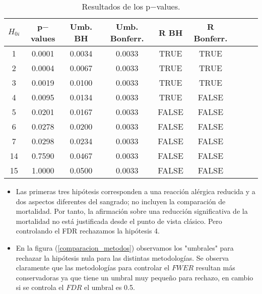 \begin{frame}
\begin{table} \label{t_p_ejecicio}
\begin{tabular}{ccccccccc}
\hline
\hline
$H_{0i}$ & p$-$values  &  Umb. BH & Umb. Bonferr. & R BH& R Bonferr.\\
\hline
\hline
1 &   0.0001& 0.0034&       0.0033&       TRUE&               TRUE\\
2 &   0.0004& 0.0067&       0.0033&       TRUE&               TRUE\\
3 &   0.0019& 0.0100&       0.0033&       TRUE&               TRUE\\
4 &   0.0095& 0.0134&       0.0033&       TRUE&              FALSE\\
5 &   0.0201& 0.0167&       0.0033&      FALSE&              FALSE\\
6 &   0.0278& 0.0200&       0.0033&      FALSE&              FALSE\\
7 &   0.0298& 0.0234&       0.0033&      FALSE&              FALSE\\
14&   0.7590& 0.0467&       0.0033&      FALSE&              FALSE\\
15&   1.0000& 0.0500&       0.0033&      FALSE&              FALSE\\
\hline
\hline
\end{tabular}
\caption{Resultados de los p$-$values.}
\end{table}
\end{frame}

\begin{frame}

	\begin{itemize}[<+- | alert@+>]
		\item Las primeras tres hipótesis corresponden a una reacción alérgica reducida y a dos aspectos diferentes del sangrado; no incluyen la comparación de mortalidad. Por tanto, la afirmación sobre una reducción significativa de la mortalidad no está justificada desde el punto de vista clásico. Pero controlando el FDR rechazamos la hipótesis 4.
		\item En la figura (\ref{comparacion_metodos}) observamos los "umbrales" para rechazar la hipótesis nula  para las distintas metodologías. Se observa claramente que las metodologías para controlar el $FWER$ resultan más conservadoras ya que tiene un umbral muy pequeño para rechazo, en cambio si se controla el $FDR$ el umbral es 0.5.
	\end{itemize}

\end{frame}

